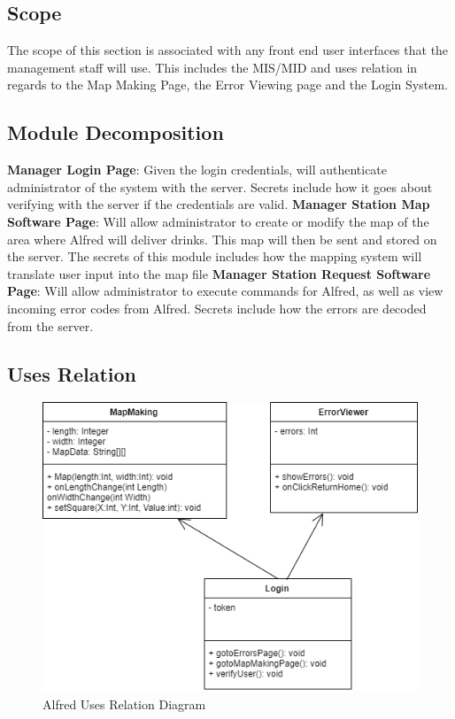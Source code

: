 \documentclass [10pt]{article}
\begin{document}
\subsection{Scope}

The scope of this section is associated with any front end user interfaces that the management staff will use. This includes the MIS/MID and uses relation in regards to the Map Making Page, the Error Viewing page and the Login System. 

\subsection{Module Decomposition}

\textbf{Manager Login Page}: Given the login credentials, will authenticate administrator of the system with the server. Secrets include how it goes about verifying with the server if the credentials are valid.
\textbf{Manager Station Map Software Page}: Will allow administrator to create or modify the map of the area where Alfred will deliver drinks. This map will then be sent and stored on the server. The secrets of this module includes how the mapping system will translate user input into the map file
\textbf{Manager Station Request Software Page}: Will allow administrator to execute commands for Alfred, as well as view incoming error codes from Alfred. Secrets include how the errors are decoded from the server.

\subsection{Uses Relation}

\begin{figure} [h!]
	\centering
	\includegraphics [scale = 0.4] {figures/Manager_UsesDiagram.png}
	\caption{Alfred Uses Relation Diagram}
\end{figure}
\end{document}
